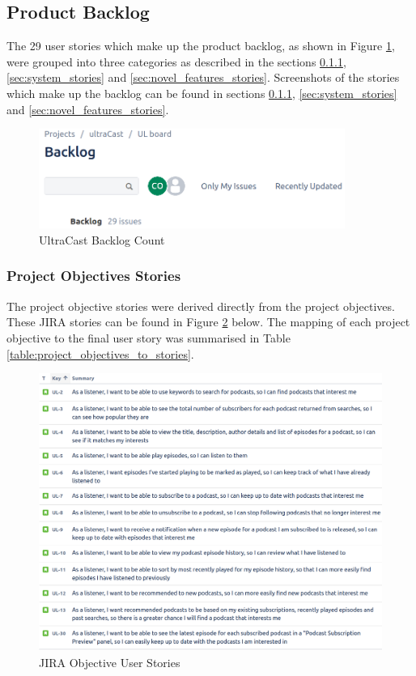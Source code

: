 \documentclass[12pt]{article}
\begin{document}
\subsection{Product Backlog}

The 29 user stories which make up the product backlog, as shown in Figure \ref{fig:backlog}, were grouped into three categories as described in the sections \ref{sec:project_objectives_stories}, \ref{sec:system_stories} and \ref{sec:novel_features_stories}.
Screenshots of the stories which make up the backlog can be found in sections \ref{sec:project_objectives_stories}, \ref{sec:system_stories} and \ref{sec:novel_features_stories}.

\begin{figure}[ht]
    \centering
    \includegraphics[width=10cm]{resources/project_backlog}
    \caption{UltraCast Backlog Count}
    \label{fig:backlog}
\end{figure}

\subsubsection{Project Objectives Stories} \label{sec:project_objectives_stories}

The project objective stories were derived directly from the project objectives. These JIRA stories can be found in Figure \ref{fig:jira_stories} below.
The mapping of each project objective to the final user story was summarised in Table \ref{table:project_objectives_to_stories}.

\begin{figure}[ht]
    \centering
    \includegraphics[width=\textwidth]{resources/objective_stories}
    \caption{JIRA Objective User Stories}
    \label{fig:jira_stories}
\end{figure}
\end{document}
